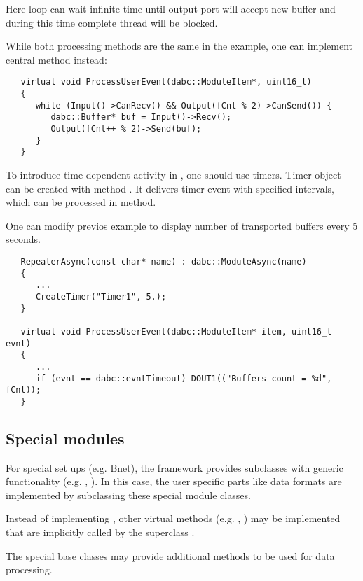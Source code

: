 Here  loop can wait infinite time until output port will accept new buffer
and during this time complete thread will be blocked. 

While both processing methods are the same in the example,  
one can implement central  method instead:  
 
\begin{small}
\begin{verbatim}
   virtual void ProcessUserEvent(dabc::ModuleItem*, uint16_t)
   {
      while (Input()->CanRecv() && Output(fCnt % 2)->CanSend()) {
         dabc::Buffer* buf = Input()->Recv();
         Output(fCnt++ % 2)->Send(buf);
      }
   }
\end{verbatim}
\end{small}

To introduce time-dependent activity in , 
one should use timers. Timer object can be created with method 
. It delivers timer event with specified intervals, 
which can be processed in  method.

One can modify previos example to display number of transported buffers
every 5 seconds.

\begin{small}
\begin{verbatim}
   RepeaterAsync(const char* name) : dabc::ModuleAsync(name)
   {
      ...
      CreateTimer("Timer1", 5.);
   }

   virtual void ProcessUserEvent(dabc::ModuleItem* item, uint16_t evnt)
   {
      ...
      if (evnt == dabc::evntTimeout) DOUT1(("Buffers count = %d", fCnt));  
   }
\end{verbatim}
\end{small}
   

\subsection{Special modules}
For special set ups (e.g. Bnet), the framework provides 
    subclasses with generic functionality 
   (e.g. , ). 
   In this case, the user specific parts like data formats are 
   implemented by subclassing these special module classes.

   
\begin{compactenum}

\item  Instead of implementing , other virtual 
      methods (e.g. , ) may be 
      implemented that are implicitly called by the superclass .
\item  The special base classes may provide additional 
      methods to be used for data processing.    
\end{compactenum}

